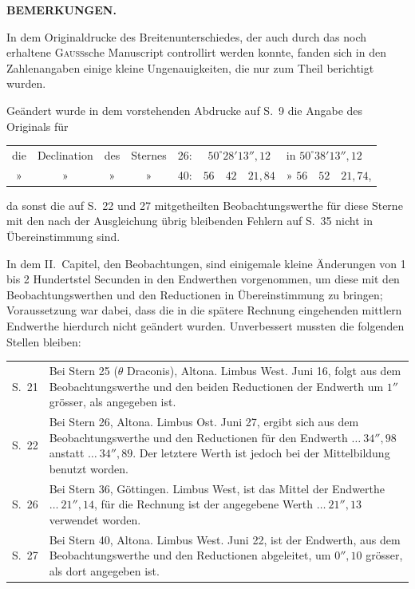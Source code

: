 \clearpage
\vspace*{14mm}
\begin{center}\textbf{BEMERKUNGEN.}\end{center}
{\small
In dem Originaldrucke des Breitenunterschiedes, der auch durch das noch erhaltene \textsc{Gauss}sche Manuscript controllirt werden konnte, fanden sich in den Zahlenangaben einige kleine Ungenauigkeiten, die nur zum Theil berichtigt wurden.

Geändert wurde in dem vorstehenden Abdrucke auf S.\ 9 die Angabe des Originals für
\begin{center}
\par\noindent\begin{tabular}{ccccccl}
die&Declination&des&Sternes&26:&$50^\circ28'13''{,}12$&in $50^\circ38'13''{,}12$\\
»&»&»&»&40:&$56\quad42\quad21{,}84$&» $56\quad52\quad21{,}74$,
\end{tabular}
\end{center}
da sonst die auf S.\ 22 und 27 mitgetheilten Beobachtungswerthe für diese Sterne mit den nach der Ausgleichung übrig bleibenden Fehlern auf S.\ 35 nicht in Übereinstimmung sind.

In dem II.\ Capitel, den Beobachtungen, sind einigemale kleine Änderungen von 1 bis 2 Hundertstel Secunden in den Endwerthen vorgenommen, um diese mit den Beobachtungswerthen und den Reductionen in Übereinstimmung zu bringen; Voraussetzung war dabei, dass die in die spätere Rechnung eingehenden mittlern Endwerthe hierdurch nicht geändert wurden. Unverbessert mussten die folgenden Stellen bleiben:
\par\noindent\begin{tabular}{@{}p{.065\linewidth}p{.91\linewidth}@{}}
S.\ 21&Bei Stern 25 ($\theta$ Draconis), Altona. Limbus West. Juni 16, folgt aus dem Beobachtungswerthe und den beiden Reductionen der Endwerth um $1''$ grösser, als angegeben ist.\\
S.\ 22&Bei Stern 26, Altona. Limbus Ost. Juni 27, ergibt sich aus dem Beobachtungswerthe und den Reductionen für den Endwerth $\ldots\ 34''{,}98$ anstatt $\ldots\ 34''{,}89$. Der letztere Werth ist jedoch bei der Mittelbildung benutzt worden.\\
S.\ 26&Bei Stern 36, Göttingen. Limbus West, ist das Mittel der Endwerthe $\ldots\ 21''{,}14$, für die Rechnung ist der angegebene Werth $\ldots\ 21''{,}13$ verwendet worden.\\
S.\ 27&Bei Stern 40, Altona. Limbus West. Juni 22, ist der Endwerth, aus dem Beobachtungswerthe und den Reductionen abgeleitet, um $0''{,}10$ grösser, als dort angegeben ist.
\end{tabular}

}
